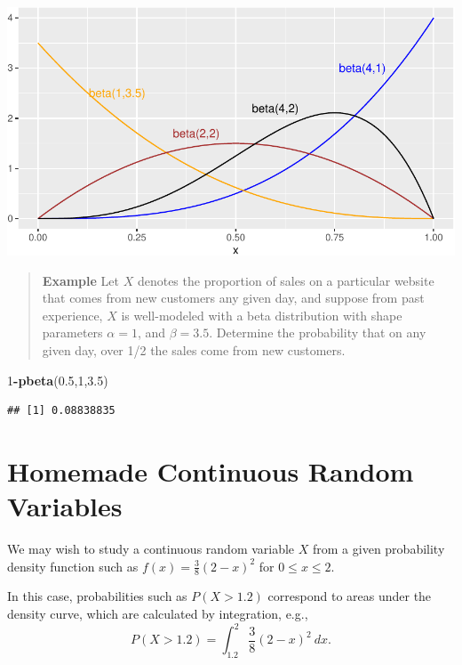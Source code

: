\documentclass[
]{book}
\newenvironment{Shaded}{\begin{snugshade}}{\end{snugshade}}
\newcommand{\DecValTok}[1]{\textcolor[rgb]{0.00,0.00,0.81}{#1}}
\newcommand{\FloatTok}[1]{\textcolor[rgb]{0.00,0.00,0.81}{#1}}
\newcommand{\FunctionTok}[1]{\textcolor[rgb]{0.13,0.29,0.53}{\textbf{#1}}}
\newcommand{\NormalTok}[1]{#1}
\newcommand{\SpecialCharTok}[1]{\textcolor[rgb]{0.81,0.36,0.00}{\textbf{#1}}}
\theoremstyle{definition}
\theoremstyle{definition}
\theoremstyle{definition}
\theoremstyle{definition}
\theoremstyle{remark}
\begin{document}
\begin{center}\includegraphics{math340-notes_files/figure-latex/unnamed-chunk-194-1} \end{center}

\begin{quote}
\textbf{Example} Let \(X\) denotes the proportion of sales on a particular website that comes from new customers any given day, and suppose from past experience, \(X\) is well-modeled with a beta distribution with shape parameters \(\alpha = 1\), and \(\beta=3.5\). Determine the probability that on any given day, over 1/2 the sales come from new customers.
\end{quote}

\begin{Shaded}
\begin{Highlighting}[]
\DecValTok{1}\SpecialCharTok{{-}}\FunctionTok{pbeta}\NormalTok{(}\FloatTok{0.5}\NormalTok{,}\DecValTok{1}\NormalTok{,}\FloatTok{3.5}\NormalTok{)}
\end{Highlighting}
\end{Shaded}

\begin{verbatim}
## [1] 0.08838835
\end{verbatim}

\section{Homemade Continuous Random Variables}\label{customR}

We may wish to study a continuous random variable \(X\) from a given probability density function such as \(f(x) = \frac{3}{8}(2-x)^2\) for \(0 \leq x \leq 2\).

In this case, probabilities such as \(P(X > 1.2)\) correspond to areas under the density curve, which are calculated by integration, e.g., \[P(X > 1.2) = \int_{1.2}^2 \frac{3}{8}(2-x)^2~dx.\]
\end{document}
